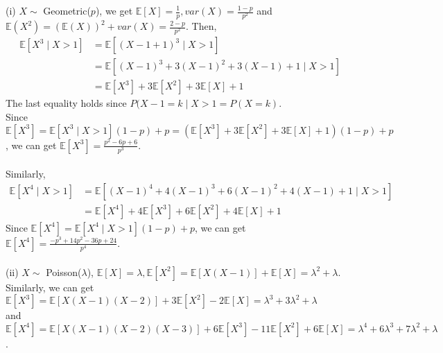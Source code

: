 \documentclass{homework}
\begin{document}
\question%
(i) $X \sim$ Geometric($p$), we get $\mathbb{E}[X]=\frac{1}{p}, var(X)=\frac{1-p}{p^2}$ 
and $\mathbb{E}(X^2)=(\mathbb{E}(X))^2+var(X)=\frac{2-p}{p^2}$. Then, \\
\begin{equation}
    \begin{aligned}
        \mathbb{E}[X^3 \mid X>1] &=\mathbb{E}[(X-1+1)^3 \mid X>1] \\
                                 &=\mathbb{E}[(X-1)^3+3(X-1)^2+3(X-1)+1 \mid X>1] \\
                                 &=\mathbb{E}[X^3]+3\mathbb{E}[X^2]+3\mathbb{E}[X]+1
    \end{aligned}
\end{equation}
The last equality holds since $P(X-1=k \mid X>1=P(X=k)$.\\
Since $\mathbb{E}[X^3]= \mathbb{E}[X^3 \mid X>1](1-p)+p = 
(\mathbb{E}[X^3]+3\mathbb{E}[X^2]+3\mathbb{E}[X]+1)(1-p)+p$, 
we can get $\mathbb{E}[X^3]=\frac{p^2-6p+6}{p^3}$.\\
\\
Similarly, 
\begin{equation}
    \begin{aligned}
        \mathbb{E}[X^4 \mid X>1] &= \mathbb{E}[(X-1)^4+4(X-1)^3+6(X-1)^2+4(X-1)+1 \mid X>1]\\
                                 &=\mathbb{E}[X^4]+4\mathbb{E}[X^3]+6\mathbb{E}[X^2]+4\mathbb{E}[X]+1
    \end{aligned}
\end{equation}
Since $\mathbb{E}[X^4]= \mathbb{E}[X^4 \mid X>1](1-p)+p$, we can get $\mathbb{E}[X^4]=\frac{-p^3+14p^2-36p+24}{p^4}$.\\
\\
(ii) $X \sim$ Poisson($\lambda$), $\mathbb{E}[X]=\lambda, \mathbb{E}[X^2]=\mathbb{E}[X(X-1)]+\mathbb{E}[X]=\lambda^2+\lambda$.\\
Similarly, we can get $\mathbb{E}[X^3]=\mathbb{E}[X(X-1)(X-2)]+3\mathbb{E}[X^2]-2\mathbb{E}[X]=\lambda^3+3\lambda^2+\lambda$ \\
and $\mathbb{E}[X^4]=\mathbb{E}[X(X-1)(X-2)(X-3)]+6\mathbb{E}[X^3]-11\mathbb{E}[X^2]+6\mathbb{E}[X]=\lambda^4+6\lambda^3+7\lambda^2+\lambda$.
\end{document}
